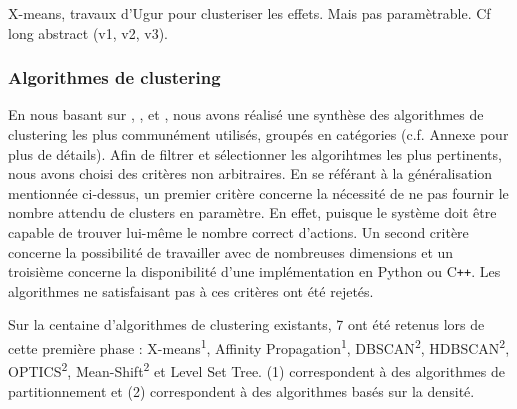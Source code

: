 \documentclass{llncs}
\begin{document}
X-means, travaux d'Ugur pour clusteriser les effets. Mais pas paramètrable. Cf long abstract (v1, v2, v3).

%



\subsubsection{Algorithmes de clustering}

En nous basant sur \cite{Xu2015}, \cite{Andreopoulos2009}, \cite{Fahad2014} et \cite{Sajana2016}, nous avons réalisé une synthèse des algorithmes de clustering les plus communément utilisés, groupés en catégories (c.f. Annexe pour plus de détails). Afin de filtrer et sélectionner les algorihtmes les plus pertinents, nous avons choisi des critères non arbitraires. En se référant à la généralisation mentionnée ci-dessus, un premier critère concerne la nécessité de ne pas fournir le nombre attendu de clusters en paramètre. En effet, puisque le système doit être capable de trouver lui-même le nombre correct d'actions. Un second critère concerne la possibilité de travailler avec de nombreuses dimensions et un troisième concerne la disponibilité d'une implémentation en Python ou C{}\verb!++!. Les algorithmes ne satisfaisant pas à ces critères ont été rejetés.

Sur la centaine d'algorithmes de clustering existants, 7 ont été retenus lors de cette première phase : X-means\textsuperscript{1}, Affinity Propagation\textsuperscript{1}, DBSCAN\textsuperscript{2}, HDBSCAN\textsuperscript{2}, OPTICS\textsuperscript{2}, Mean-Shift\textsuperscript{2} et Level Set Tree. (1) correspondent à des algorithmes de partitionnement et (2) correspondent à des algorithmes basés sur la densité.

\end{document}
